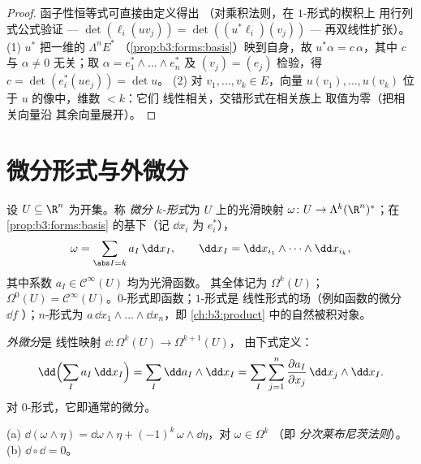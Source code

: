 \begin{proof}
函子性恒等式可直接由定义得出
（对乘积法则，在 $1$-形式的楔积上
用行列式公式验证 --- $\det(\ell_i(uv_j)) =
\det((u^*\ell_i)(v_j))$ --- 再双线性扩张）。
(1) $u^*$ 把一维的 $\Lambda^nE^*$
（\cref{prop:b3:forms:basis}）映到自身，故 $u^*\alpha =
c\,\alpha$，其中 $c$ 与 $\alpha \neq 0$ 无关；取
$\alpha = e_1^* \wedge \dots \wedge e_n^*$ 及 $(v_j) =
(e_j)$ 检验，得 $c = \det(e_i^*(ue_j)) = \det u$。
(2) 对 $v_1, \dots, v_k \in E$，向量 $u(v_1), \dots,
u(v_k)$ 位于 $u$ 的像中，维数 $< k$：它们
线性相关，交错形式在相关族上
取值为零（把相关向量沿
其余向量展开）。
\end{proof}

\section{微分形式与外微分}

\begin{definition}\label{def:b3:forms:diffform}
设 $U \subseteq \R^n$ 为开集。称 \emph{微分
$k$-形式}为 $U$ 上的光滑映射
$\omega\colon U \to \Lambda^k(\R^n)^*$；在
\cref{prop:b3:forms:basis} 的基下（记 $\dd x_i$ 为
$e_i^*$），
\[
\omega = \sum_{\abs I = k} a_I\,\dd x_I,
\qquad
\dd x_I = \dd x_{i_1} \wedge \dots \wedge \dd x_{i_k},
\]
其中系数 $a_I \in \mathcal C^\infty(U)$ 均为光滑函数。
其全体记为 $\Omega^k(U)$；$\Omega^0(U) = \mathcal
C^\infty(U)$。$0$-形式即函数；$1$-形式是
线性形式的场（例如函数的微分 $\dd f$
）；$n$-形式为 $a\,\dd x_1\wedge\dots\wedge\dd
x_n$，即 \cref{ch:b3:product} 中的自然被积对象。
\end{definition}

\begin{definition}[外微分]\label{def:b3:forms:d}
\emph{外微分}是
线性映射 $\dd\colon \Omega^k(U) \to \Omega^{k+1}(U)$，
由下式定义：
\[
\dd\Bigl(\sum_I a_I\,\dd x_I\Bigr)
= \sum_I \dd a_I \wedge \dd x_I
= \sum_I\sum_{j=1}^n \frac{\partial a_I}{\partial
x_j}\,\dd x_j \wedge \dd x_I .
\]
对 $0$-形式，它即通常的微分。
\end{definition}

\begin{theorem}\label{thm:b3:forms:dsquare}
(a) $\dd(\omega \wedge \eta) = \dd\omega \wedge \eta +
(-1)^k\,\omega \wedge \dd\eta$，对 $\omega \in \Omega^k$
（即 \emph{分次莱布尼茨法则}）。
(b) $\dd \circ \dd = 0$。
\end{theorem}

